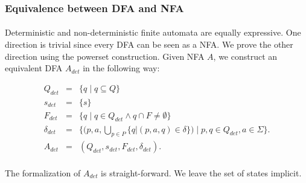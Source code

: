 

\subsubsection{Equivalence between DFA and NFA}
\paragraph{} 
Deterministic and non-deterministic finite automata are equally expressive. 
One direction is trivial since every DFA can be seen as a NFA. 
We prove the other direction using the powerset construction. 
Given NFA $A$, we construct an equivalent DFA $A_{det}$ in the following way:

    \begin{eqnarray*}
        Q_{det} & = & \{q \; | \; q \subseteq Q\} \\
        {s}_{det} & = & \{ s \} \\
        F_{det} & = & \{ q \; | \; q \in Q_{det} \wedge q \cap F \neq \emptyset \} \\
        \delta_{det} & = & \{ (p,a,\bigcup \limits _{p \in P} \{ q | (p,a,q) \in \delta \}) \; | \; p, q \in Q_{det}, a \in \Sigma \}.     \\
        A_{det} &=&  (Q_{det}, s_{det}, F_{det}, \delta_{det}).
    \end{eqnarray*}

    \paragraph{}
    The formalization of $A_{det}$ is straight-forward. 
    We leave the set of states implicit.


